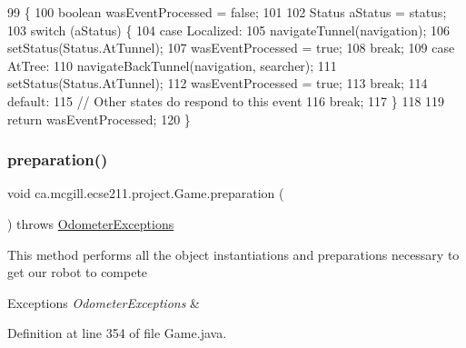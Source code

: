 \begin{DoxyCode}
99                                                                                 \{
100     \textcolor{keywordtype}{boolean} wasEventProcessed = \textcolor{keyword}{false};
101 
102     Status aStatus = status;
103     \textcolor{keywordflow}{switch} (aStatus) \{
104       \textcolor{keywordflow}{case} Localized:
105         navigateTunnel(navigation);
106         setStatus(Status.AtTunnel);
107         wasEventProcessed = \textcolor{keyword}{true};
108         \textcolor{keywordflow}{break};
109       \textcolor{keywordflow}{case} AtTree:
110         navigateBackTunnel(navigation, searcher);
111         setStatus(Status.AtTunnel);
112         wasEventProcessed = \textcolor{keyword}{true};
113         \textcolor{keywordflow}{break};
114       \textcolor{keywordflow}{default}:
115         \textcolor{comment}{// Other states do respond to this event}
116         \textcolor{keywordflow}{break};
117     \}
118 
119     \textcolor{keywordflow}{return} wasEventProcessed;
120   \}
\end{DoxyCode}
\mbox{\label{enumca_1_1mcgill_1_1ecse211_1_1project_1_1_game_a8f3c5b18f98ee56f5f03afd72fa40bcb}} 
\subsubsection{\texorpdfstring{preparation()}{preparation()}}
{\footnotesize\ttfamily void ca.\+mcgill.\+ecse211.\+project.\+Game.\+preparation (\begin{DoxyParamCaption}{ }\end{DoxyParamCaption}) throws \hyperlink{classca_1_1mcgill_1_1ecse211_1_1odometer_1_1_odometer_exceptions}{Odometer\+Exceptions}}

This method performs all the object instantiations and preparations necessary to get our robot to compete


\begin{DoxyExceptions}{Exceptions}
{\em Odometer\+Exceptions} & \\
\hline
\end{DoxyExceptions}


Definition at line 354 of file Game.\+java.



